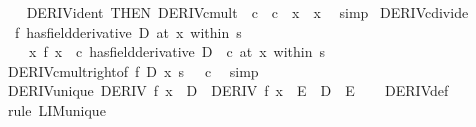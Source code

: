 \begin{isabellebody}
%
\isadelimproof
\ \ %
\endisadelimproof
%
\isatagproof
{}\isamarkupfalse%
\ DERIV{\isacharunderscore}{\kern0pt}ident\ {\isacharbrackleft}{\kern0pt}THEN\ DERIV{\isacharunderscore}{\kern0pt}cmult{\isacharcomma}{\kern0pt}\ \ c\ {\isacharequal}{\kern0pt}\ c\ \ x\ {\isacharequal}{\kern0pt}\ x{\isacharbrackright}{\kern0pt}\ \isamarkupfalse%
\ simp%
\endisatagproof
{\isafoldproof}%
%
\isadelimproof
\isanewline
%
\endisadelimproof
\isanewline
{}\isamarkupfalse%
\ DERIV{\isacharunderscore}{\kern0pt}cdivide{\isacharcolon}{\kern0pt}\isanewline
\ \ {\isachardoublequoteopen}{\isacharparenleft}{\kern0pt}f\ has{\isacharunderscore}{\kern0pt}field{\isacharunderscore}{\kern0pt}derivative\ D{\isacharparenright}{\kern0pt}\ {\isacharparenleft}{\kern0pt}at\ x\ within\ s{\isacharparenright}{\kern0pt}\ {\isasymLongrightarrow}\isanewline
\ \ \ \ {\isacharparenleft}{\kern0pt}{\isacharparenleft}{\kern0pt}{\isasymlambda}x{\isachardot}{\kern0pt}\ f\ x\ {\isacharslash}{\kern0pt}\ c{\isacharparenright}{\kern0pt}\ has{\isacharunderscore}{\kern0pt}field{\isacharunderscore}{\kern0pt}derivative\ D\ {\isacharslash}{\kern0pt}\ c{\isacharparenright}{\kern0pt}\ {\isacharparenleft}{\kern0pt}at\ x\ within\ s{\isacharparenright}{\kern0pt}{\isachardoublequoteclose}\isanewline
%
\isadelimproof
\ \ %
\endisadelimproof
%
\isatagproof
{}\isamarkupfalse%
\ DERIV{\isacharunderscore}{\kern0pt}cmult{\isacharunderscore}{\kern0pt}right{\isacharbrackleft}{\kern0pt}of\ f\ D\ x\ s\ {\isachardoublequoteopen}{}\ {\isacharslash}{\kern0pt}\ c{\isachardoublequoteclose}{\isacharbrackright}{\kern0pt}\ \isamarkupfalse%
\ simp%
\endisatagproof
{\isafoldproof}%
%
\isadelimproof
\isanewline
%
\endisadelimproof
\isanewline
{}\isamarkupfalse%
\ DERIV{\isacharunderscore}{\kern0pt}unique{\isacharcolon}{\kern0pt}\ {\isachardoublequoteopen}DERIV\ f\ x\ {\isacharcolon}{\kern0pt}{\isachargreater}{\kern0pt}\ D\ {\isasymLongrightarrow}\ DERIV\ f\ x\ {\isacharcolon}{\kern0pt}{\isachargreater}{\kern0pt}\ E\ {\isasymLongrightarrow}\ D\ {\isacharequal}{\kern0pt}\ E{\isachardoublequoteclose}\isanewline
%
\isadelimproof
\ \ %
\endisadelimproof
%
\isatagproof
{}\isamarkupfalse%
\ DERIV{\isacharunderscore}{\kern0pt}def\ \isamarkupfalse%
\ {\isacharparenleft}{\kern0pt}rule\ LIM{\isacharunderscore}{\kern0pt}unique{\isacharparenright}{\kern0pt}%
\endisatagproof
{\isafoldproof}%
%
\isadelimproof
\isanewline
%
\endisadelimproof
\isanewline
{}\isamarkupfalse%

\end{isabellebody}
